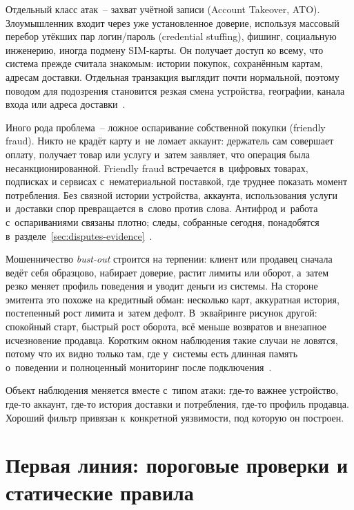 Отдельный класс атак~-- захват учётной записи (Account Takeover, ATO).
Злоумышленник входит через уже установленное доверие, используя
массовый перебор утёкших пар логин/пароль (credential stuffing), фишинг,
социальную инженерию, иногда подмену SIM-карты. Он получает доступ ко всему,
что система прежде считала знакомым: истории покупок, сохранённым
картам, адресам доставки. Отдельная транзакция выглядит почти
нормальной, поэтому поводом для подозрения становится резкая смена
устройства, географии, канала входа или адреса
доставки~\cite{mc-fraudulent-merchants-2025}.

Иного рода проблема~-- ложное оспаривание собственной покупки
(friendly fraud). Никто не крадёт карту и~не ломает аккаунт:
держатель сам совершает оплату, получает товар или услугу
и~затем заявляет, что операция была несанкционированной. Friendly fraud встречается
в~цифровых товарах, подписках и сервисах с~нематериальной поставкой,
где труднее показать момент потребления. Без связной истории устройства,
аккаунта, использования услуги и~доставки спор превращается в~слово
против слова. Антифрод и~работа с~оспариваниями связаны плотно; следы,
собранные сегодня, понадобятся
в~разделе~\ref{sec:disputes-evidence}~\cite{mc-first-party-trust}.

Мошенничество \textit{bust-out} строится на терпении: клиент или продавец
сначала ведёт себя образцово, набирает доверие, растит
лимиты или оборот, а~затем резко меняет профиль поведения и уводит
деньги из системы. На стороне эмитента это похоже на кредитный обман:
несколько карт, аккуратная история, постепенный рост лимита и~затем
дефолт. В~эквайринге рисунок другой: спокойный старт, быстрый рост
оборота, всё меньше возвратов и внезапное исчезновение продавца.
Коротким окном наблюдения такие случаи не ловятся, потому что их видно
только там, где у~системы есть длинная память о~поведении и полноценный
мониторинг после подключения~\cite{visa-merchant-screening-service,mc-fraudulent-merchants-2025}.

Объект наблюдения меняется вместе с~типом атаки: где-то важнее
устройство, где-то аккаунт, где-то история доставки и потребления,
где-то профиль продавца. Хороший фильтр привязан к~конкретной
уязвимости, под которую он построен.

\section{Первая линия: пороговые проверки и статические правила}\label{sec:fraud-rules}

